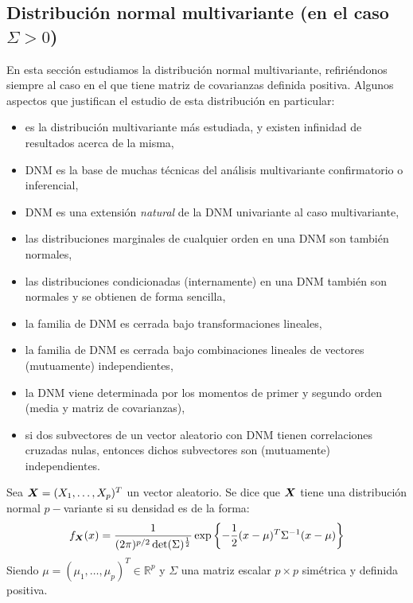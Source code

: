 \subsection{Distribución normal multivariante (en el caso $\Sigma > 0$)}
  En esta sección estudiamos la distribución normal multivariante, refiriéndonos siempre al caso en el que tiene matriz de covarianzas definida positiva.
Algunos aspectos que justifican el estudio de esta distribución en particular:
\begin{itemize}
\item es la distribución multivariante más estudiada, y existen infinidad de resultados acerca de la misma,
\item DNM es la base de muchas técnicas del análisis multivariante confirmatorio o inferencial,
\item DNM es una extensión \emph{natural} de la DNM univariante al caso multivariante,
\item las distribuciones marginales de cualquier orden en una DNM son también normales,
\item las distribuciones condicionadas (internamente) en una DNM también son normales y se obtienen de forma sencilla,
\item la familia de DNM es cerrada bajo transformaciones lineales,
\item la familia de DNM es cerrada bajo combinaciones lineales de vectores (mutuamente) independientes,
\item la DNM viene determinada por los momentos de primer y segundo orden (media y matriz de covarianzas),
  \item si dos subvectores de un vector aleatorio con DNM tienen correlaciones cruzadas nulas, entonces dichos subvectores son (mutuamente) independientes.

\end{itemize}


\begin{ndef}
  Sea $\boldsymbol{X} = (X_1,\dots, X_p)^T$ un vector aleatorio. Se dice que $\boldsymbol{X}$ tiene una distribución normal $p-$variante si su densidad es de la forma:
  \[
f_{\boldsymbol{X}}(x) = \frac{1}{(2\pi)^{p/2}\det(\Sigma)^{\frac{1}{2}}} \exp\left\{- \dfrac{1}{2}(x-\mu)^T \Sigma^{-1}(x-\mu)\right\}
\]
Siendo $\mu = (\mu_1, \dots, \mu_p)^T \in \mathbb R^p$ y $\Sigma$ una matriz escalar $p\times p$ simétrica y definida positiva.
\end{ndef}

